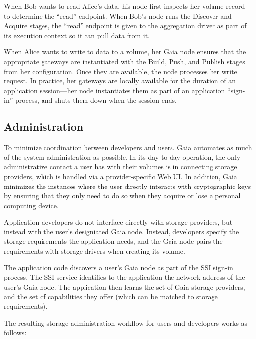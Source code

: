 When Bob wants to read Alice's data, his node first inspects her volume record
to determine the ``read'' endpoint.  When Bob's node runs the Discover and
Acquire stages, the ``read'' endpoint is given to the aggregation driver as part
of its execution context so it can pull data from it.

When Alice wants to write to data to a volume, her Gaia node ensures that the
appropriate gateways are instantiated with the Build, Push, and Publish stages
from her configuration.  Once they are available, the node processes her write
request.  In practice, her gateways are locally available for the duration of an
application session---her node instantiates them as part of an application
``sign-in'' process, and shuts them down when the session ends.

\subsection{Administration}

To minimize coordination between developers and users, Gaia
automates as much of the system administration as possible.
In its day-to-day operation, the only administrative contact a user has with their volumes is
in connecting storage providers, which is handled via a provider-specific Web
UI.  In addition, Gaia minimizes the instances where the user directly interacts with cryptographic keys
by ensuring that they only need to do so when they acquire or lose a personal
computing device.

Application developers do not interface directly with storage providers, but
instead with the user's designiated Gaia node.
Instead, developers specify the storage requirements the
application needs, and the Gaia node pairs the requirements with storage drivers
when creating its volume.


The application code discovers a user's Gaia node as part of the SSI sign-in
process.  The SSI service identifies to the application the network address
of the user's Gaia node.  The application then learns the set of Gaia storage
providers, and the set of capabilities they offer (which can be matched to
storage requirements).

The resulting storage administration workflow for users and developers works as
follows:

